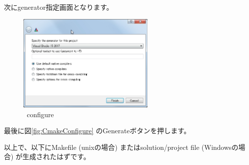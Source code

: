 次にgenerator指定画面となります。
\begin{narrow}[15pt]
	\begin{figure}[h]
	\begin{center}
	\includegraphics[width=0.6\textwidth]{fig/CmakeConfigure3.eps}
	\end{center}
	\caption{\cmake\ configure}
	\label{fig:CmakeGeneration}
	\end{figure}
\end{narrow}

最後に図\ref{fig:CmakeConfigure} のGenerateボタンを押します。

\medskip
以上で、\DQuote{\BldDir}以下にMakefile (unixの場合)
またはsolution/project file (Windowsの場合)
が生成されたはずです。

\bigskip
